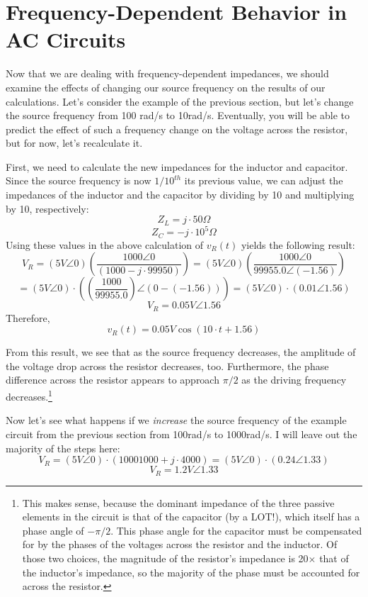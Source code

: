 \section{Frequency-Dependent Behavior in AC Circuits}
Now that we are dealing with frequency-dependent impedances, we should examine the effects of changing our source frequency on the results of our calculations. Let's consider the example of the previous section, but let's change the source frequency from 100 rad/s to 10rad/s. Eventually, you will be able to predict the effect of such a frequency change on the voltage across the resistor, but for now, let's recalculate it.
\par
First, we need to calculate the new impedances for the inductor and capacitor. Since the source frequency is now $1/10^{th}$ its previous value, we can adjust the impedances of the inductor and the capacitor by dividing by 10 and multiplying by 10, respectively:
$$
Z_L = j\cdot50\Omega
$$
$$
Z_C = -j\cdot10^5\Omega
$$
Using these values in the above calculation of $v_R(t)$ yields the following result:
$$
V_R = (5V\angle0)\left(\frac{1000\angle0}{(1000 - j\cdot99950)}\right) = (5V\angle0)\left(\frac{1000\angle0}{99955.0\angle(-1.56)}\right)
$$
$$
= (5V\angle0)\cdot\left(\left(\frac{1000}{99955.0}\right)\angle(0- (-1.56))\right) = (5V\angle0)\cdot(0.01\angle1.56)
$$
$$
V_R=0.05V\angle1.56
$$
Therefore,
$$
v_R(t)=0.05V\cos(10\cdot t + 1.56)
$$
\par
From this result, we see that as the source frequency decreases, the amplitude of the voltage drop across the resistor decreases, too. Furthermore, the phase difference across the resistor appears to approach $\pi/2$ as the driving frequency decreases.\footnote{This makes sense, because the dominant impedance of the three passive elements in the circuit is that of the capacitor (by a LOT!), which itself has a phase angle of $-\pi/2$. This phase angle for the capacitor must be compensated for by the phases of the voltages across the resistor and the inductor. Of those two choices, the magnitude of the resistor's impedance is 20$\times$ that of the inductor's impedance, so the majority of the phase must be accounted for across the resistor.}
\par
Now let's see what happens if we \textit{increase} the source frequency of the example circuit from the previous section from 100rad/s to 1000rad/s. I will leave out the majority of the steps here:
$$
V_R = (5V\angle0)\cdot\left({1000}{1000+j\cdot4000}\right) = (5V\angle0)\cdot(0.24\angle1.33)
$$
$$
V_R = 1.2V\angle1.33
$$
